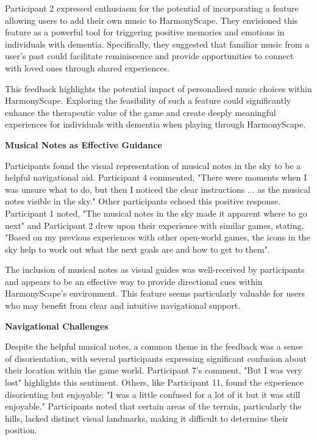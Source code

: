 \documentclass{l4proj}
\begin{document}
Participant 2 expressed enthusiasm for the potential of incorporating a feature allowing users to add their own music to HarmonyScape. They envisioned this feature as a powerful tool for triggering positive memories and emotions in individuals with dementia. Specifically, they suggested that familiar music from a user's past could facilitate reminiscence and provide opportunities to connect with loved ones through shared experiences.

This feedback highlights the potential impact of personalised music choices within HarmonyScape. Exploring the feasibility of such a feature could significantly enhance the therapeutic value of the game and create deeply meaningful experiences for individuals with dementia when playing through HarmonyScape.
\newline

\textbf{Musical Notes as Effective Guidance}

Participants found the visual representation of musical notes in the sky to be a helpful navigational aid.  Participant 4 commented, "There were moments when I was unsure what to do, but then I noticed the clear instructions ... as the musical notes visible in the sky." Other participants echoed this positive response. Participant 1 noted, "The musical notes in the sky made it apparent where to go next" and Participant 2 drew upon their experience with similar games, stating, "Based on my previous experiences with other open-world games, the icons in the sky help to work out what the next goals are and how to get to them".

The inclusion of musical notes as visual guides was well-received by participants and appears to be an effective way to provide directional cues within HarmonyScape's environment. This feature seems particularly valuable for users who may benefit from clear and intuitive navigational support.
\newline

\textbf{Navigational Challenges}

Despite the helpful musical notes, a common theme in the feedback was a sense of disorientation, with several participants expressing significant confusion about their location within the game world. Participant 7's comment, "But I was very lost" highlights this sentiment. Others, like Participant 11, found the experience disorienting but enjoyable: "I was a little confused for a lot of it but it was still enjoyable."  Participants noted that certain areas of the terrain, particularly the hills, lacked distinct visual landmarks, making it difficult to determine their position.
\end{document}
